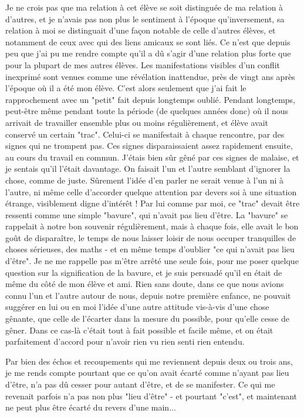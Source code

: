 Je ne crois pas que ma relation à cet élève se soit distinguée de ma relation à d'autres, et je n'avais pas non plus le sentiment à l'époque qu'inversement, sa relation à moi se distinguait d'une façon notable de celle d'autres élèves, et notamment de ceux avec qui des liens amicaux se sont liés. Ce n'est que depuis peu que j'ai pu me rendre compte qu'il a dû s'agir d'une relation plus forte que pour la plupart de mes autres élèves. Les manifestations visibles d'un conflit inexprimé sont venues comme une révélation inattendue, près de vingt ans après l'époque où il a été mon élève. C'est alors seulement que j'ai fait le rapprochement avec un "petit" fait depuis longtemps oublié. Pendant longtemps, peut-être même pendant toute la période (de quelques années donc) où il nous arrivait de travailler ensemble plus ou moins régulièrement, et élève avait conservé un certain "trac". Celui-ci se manifestait à chaque rencontre, par des signes qui ne trompent pas. Ces signes disparaissaient assez rapidement ensuite, au cours du travail en commun. J'étais bien sûr gêné par ces signes de malaise, et je sentais qu'il l'était davantage. On faisait l'un et l'autre semblant d'ignorer la chose, comme de juste. Sûrement l'idée d'en parler ne serait venue à l'un ni à l'autre, ni même celle d'accorder quelque attention par devers soi à une situation étrange, visiblement digne d'intérêt ! Par lui comme par moi, ce "trac" devait être ressenti comme une simple "bavure", qui n'avait pas lieu d'être. La "bavure" se rappelait à notre bon souvenir régulièrement, mais à chaque fois, elle avait le bon goût de disparaître, le temps de nous laisser loisir de nous occuper tranquilles de choses sérieuses, des maths - et en même temps d'oublier "ce qui n'avait pas lieu d'être". Je ne me rappelle pas m'être arrêté une seule fois, pour me poser quelque question sur la signification de la bavure, et je suis persuadé qu'il en était de même du côté de mon élève et ami. Rien sans doute, dans ce que nous avions connu l'un et l'autre autour de nous, depuis notre première enfance, ne pouvait suggérer en lui ou en moi l'idée d'une autre attitude vis-à-vis d'une chose gênante, que celle de l'écarter dans la mesure du possible, pour qu'elle cesse de gêner. Dans ce cas-là c'était tout à fait possible et facile même, et on était parfaitement d'accord pour n'avoir rien vu rien senti rien entendu.

Par bien des échos et recoupements qui me reviennent depuis deux ou trois ans, je me rends compte pourtant que ce qu'on avait écarté comme n'ayant pas lieu d'être, n'a pas dû cesser pour autant d'être, et de se manifester. Ce qui me revenait parfois n'a pas non plus "lieu d'être" - et pourtant "c'est", et maintenant ne peut plus être écarté du revers d'une main...



